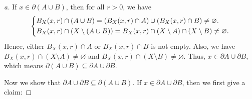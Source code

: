\begin{proof}[a]
  If \(x \in \partial (A \cup B)\), then for all \(r > 0\), we have 
  \[
    \begin{dcases}
      B_X(x, r) \cap (A \cup B) = \left( B_X(x, r) \cap A \right) \cup \left( B_X(x, r) \cap B \right) \neq \varnothing. \\
      B_X(x, r) \cap \left( X \setminus (A \cup B) \right) = B_X(x, r) \cap \left( X \setminus A \right) \cap \left( X \setminus B \right) \neq \varnothing.
    \end{dcases}
  \] 
  Hence, either \(B_X(x, r) \cap A\) or \(B_X(x, r) \cap B\) is not empty. Also, we have \(B_X(x, r) \cap \left( X \setminus A \right) \neq \varnothing  \) and \(B_X(x, r) \cap \left( X \setminus B \right) \neq \varnothing  \). Thus, \(x \in \partial A \cup \partial B\), which means \(\partial (A \cup B) \subseteq \partial A \cup \partial B\).    
  
  Now we show that \(\partial A \cup \partial B \subseteq \partial (A \cup B)\). If \(x \in \partial A \cup \partial B\), then we first give a claim: 
  

\end{proof}
